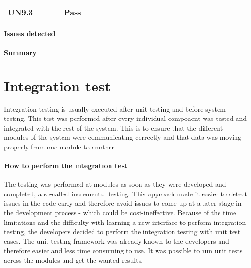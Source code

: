 {\begin{longtable}{ | p{1.5cm} | p{6.5cm} | p{3cm} | p{6.5cm} |}
			UN9.3 &  &   & & Pass \\ \hline	
			
		\end{longtable}


\paragraph{Issues detected}

\paragraph{Summary}


\section{Integration test}
\label{sec_integration_testing}

Integration testing is usually executed after unit testing and before system testing. This test was performed after every individual component was tested and integrated with the rest of the system. This is to ensure that the different modules of the system were communicating correctly and that data was moving properly from one module to another. \newline

\paragraph{How to perform the integration test}
The testing was performed at modules as soon as they were developed and completed, a so-called incremental testing. This approach made it easier to detect issues in the code early and therefore avoid issues to come up at a later stage in the development process - which could be cost-ineffective.
Because of the time limitations and the difficulty with learning a new interface to perform integration testing, the developers decided to perform the integration testing with unit test cases. The unit testing framework was already known to the developers and therefore easier and less time consuming to use. It was possible to run unit tests across the modules and get the wanted results.\newline

}
